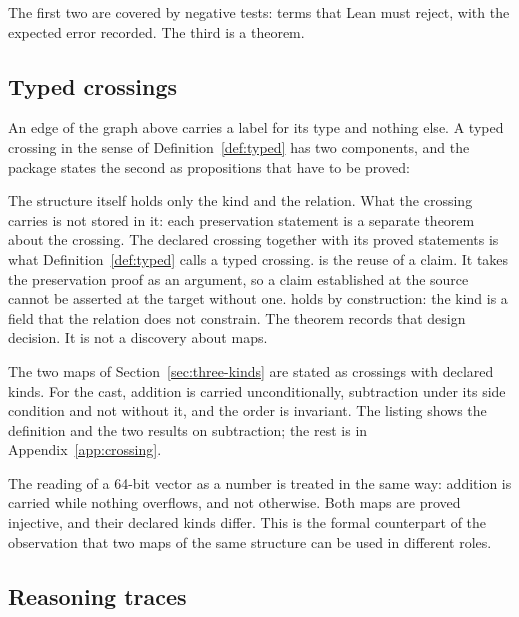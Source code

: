 \noindent
The first two are covered by negative tests: terms that Lean must reject, with the
expected error recorded. The third is a theorem.

\subsection{Typed crossings}
\label{sec:mech-crossing}

An edge of the graph above carries a label for its type and nothing else. A typed
crossing in the sense of Definition~\ref{def:typed} has two components, and the package
states the second as propositions that have to be proved:



\noindent
The structure  itself holds only the kind and the relation. What the
crossing carries is not stored in it: each preservation statement is a separate theorem
about the crossing. The declared crossing together with its proved statements is what
Definition~\ref{def:typed} calls a typed crossing.  is the reuse of a
claim. It takes the preservation proof as an
argument, so a claim established at the source cannot be asserted at the target without
one.  holds by construction: the kind is a field that the
relation does not constrain. The theorem records that design decision. It is not a
discovery about maps.

The two maps of Section~\ref{sec:three-kinds} are stated as crossings with declared
kinds. For the cast, addition is carried unconditionally, subtraction under its side
condition and not without it, and the order is invariant. The listing shows the
definition and the two results on subtraction; the rest is in
Appendix~\ref{app:crossing}.



\noindent
The reading of a 64-bit vector as a number is treated in the same way: addition is
carried while nothing overflows, and not otherwise. Both maps are proved injective, and their declared kinds differ. This is the
formal counterpart of the observation that two maps of the same structure can be used
in different roles.

\subsection{Reasoning traces}

